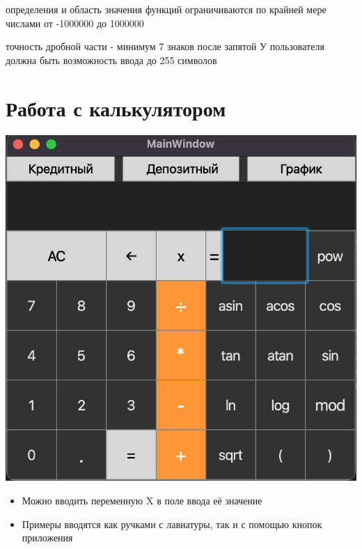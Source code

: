\documentclass[a4paper,12pt]{article}
\begin{document}
	\begin{itemize}
		
 определения и область значения функций ограничиваются по крайней мере числами от -1000000 до 1000000
	
 точность дробной части - минимум 7 знаков после запятой
	У пользователя должна быть возможность ввода до 255 символов
\end{itemize}
	
	\section{Работа с калькулятором}
	\includegraphics[scale = 0.7]{calc}
	
		\begin{itemize}
		
		\item Можно вводить переменную  X    в поле ввода её значение

		
		\item Примеры вводятся как ручками с лавиатуры, так и с помощью кнопок приложения
		
	\end{itemize}
	
\end{document}
